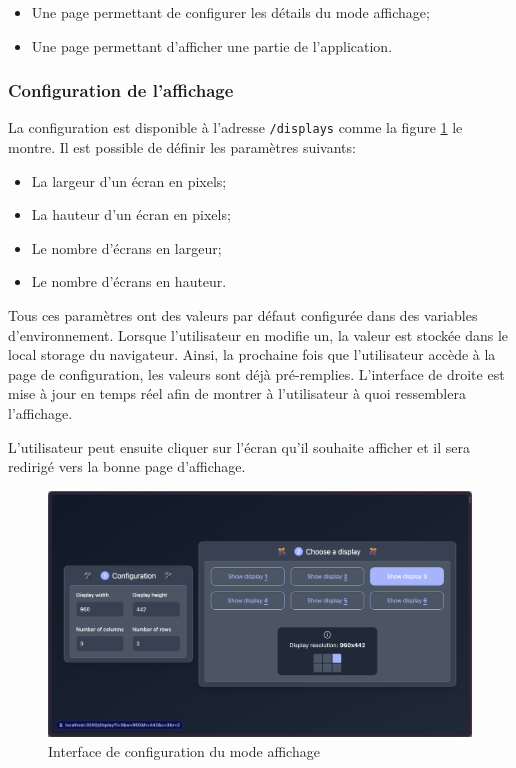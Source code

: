 \begin{itemize}
  \item Une page permettant de configurer les détails du mode affichage;
  \item Une page permettant d'afficher une partie de l'application.
\end{itemize}

\subsubsection{Configuration de l'affichage}

La configuration est disponible à l'adresse \texttt{/displays} comme la figure \ref{fig:display-mode-config} le montre. Il est possible de définir les paramètres suivants:

\begin{itemize}
  \item La largeur d'un écran en pixels;
  \item La hauteur d'un écran en pixels;
  \item Le nombre d'écrans en largeur;
  \item Le nombre d'écrans en hauteur.
\end{itemize}

Tous ces paramètres ont des valeurs par défaut configurée dans des variables d'environnement. Lorsque l'utilisateur en modifie un, la valeur est stockée dans le local storage du navigateur. Ainsi, la prochaine fois que l'utilisateur accède à la page de configuration, les valeurs sont déjà pré-remplies. L'interface de droite est mise à jour en temps réel afin de montrer à l'utilisateur à quoi ressemblera l'affichage.

L'utilisateur peut ensuite cliquer sur l'écran qu'il souhaite afficher et il sera redirigé vers la bonne page d'affichage.

\begin{figure}[H]
  \centering
  \includegraphics[width=1\textwidth]{./assets/figures/display-mode-config.png}
  \caption{Interface de configuration du mode affichage}
  \label{fig:display-mode-config}
\end{figure}

